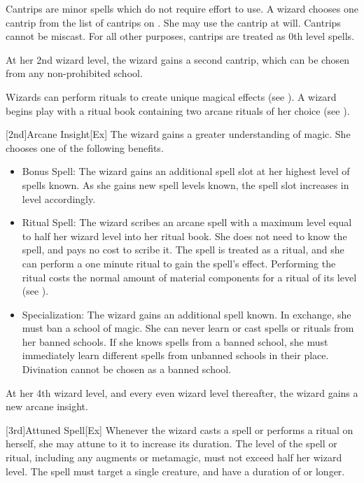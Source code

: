         Cantrips are minor spells which do not require effort to use.
        A wizard chooses one cantrip from the list of cantrips on .
        She may use the cantrip at will.
        Cantrips cannot be miscast.
        For all other purposes, cantrips are treated as 0th level spells.

        At her 2nd wizard level, the wizard gains a second cantrip, which can be chosen from any non-prohibited school.

        Wizards can perform rituals to create unique magical effects (see ).
        A wizard begins play with a ritual book containing two arcane rituals of her choice (see ).

        [2nd]{Arcane Insight}[Ex]\label{Arcane Insight}
        The wizard gains a greater understanding of magic.
        She chooses one of the following benefits.
        \begin{itemize}
            \item Bonus Spell: The wizard gains an additional spell slot at her highest level of spells known.
                As she gains new spell levels known, the spell slot increases in level accordingly.
            \item Ritual Spell: The wizard scribes an arcane spell with a maximum level equal to half her wizard level into her ritual book.
                She does not need to know the spell, and pays no cost to scribe it.
                The spell is treated as a ritual, and she can perform a one minute ritual to gain the spell's effect.
                Performing the ritual costs the normal amount of material components for a ritual of its level (see ).
            \item Specialization: The wizard gains an additional spell known.
                In exchange, she must ban a school of magic.
                She can never learn or cast spells or rituals from her banned schools.
                If she knows spells from a banned school, she must immediately learn different spells from unbanned schools in their place.
                Divination cannot be chosen as a banned school.
        \end{itemize}

        At her 4th wizard level, and every even wizard level thereafter, the wizard gains a new arcane insight.

        [3rd]{Attuned Spell}[Ex]
        Whenever the wizard casts a spell or performs a ritual on herself, she may attune to it to increase its duration.
        The level of the spell or ritual, including any augments or metamagic, must not exceed half her wizard level.
        The spell must target a single creature, and have a duration of \durshort or longer.

